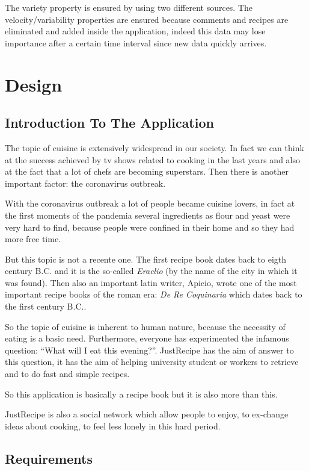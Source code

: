 \documentclass[a4paper]{report}
\begin{document}
\noindent The variety property is ensured by using two different sources. The velocity/variability properties are ensured because comments and recipes are eliminated and added inside the application, indeed this data may lose importance after a certain time interval since new data quickly arrives.

\chapter{Design}
\section{Introduction To The Application}
The topic of cuisine is extensively widespread in our society. In fact we can think at the success achieved by tv shows related to cooking in the last years and also at the fact that a lot of chefs are becoming superstars.
Then there is another important factor: the coronavirus outbreak.

\noindent With the coronavirus outbreak a lot of people became cuisine lovers, in fact at the first moments of the pandemia several ingredients as flour and yeast were very hard to find, because people were confined in their home and so they had more free time.

\noindent But this topic is not a recente one. The first recipe book dates back to eigth century B.C. and it is the so-called \emph{Eraclio} (by the name of the city in which it was found). Then also an important latin writer, Apicio, wrote one of the most important recipe books of the roman era: \emph{De Re Coquinaria} which dates back to the first century B.C..
 
\noindent So the topic of cuisine is inherent to human nature, because the necessity of eating is a basic need.
Furthermore, everyone has experimented the infamous question: “What will I eat this evening?”. JustRecipe has the aim of answer to this question, it has the aim of helping university student or workers to retrieve and to do fast and simple recipes.

\noindent So this application is basically a recipe book but it is also more than this.

\noindent JustRecipe is also a social network which allow people to enjoy, to ex-change ideas about cooking, to feel less lonely in this hard period.

\section{Requirements}
\end{document}
